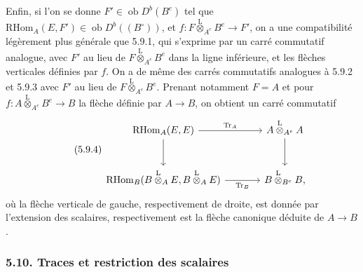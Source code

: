 \documentclass[11pt]{article}
\newcommand{\ob}{\operatorname{ob}}
\providecommand{\RHom}{\mathrm{RHom}}
\providecommand{\Tr}{\operatorname{Tr}}
\providecommand{\Tr}{\operatorname{Tr}}
\providecommand{\lten}{\overset{\mathrm L}{\otimes}}
\providecommand{\Tr}{\operatorname{Tr}}
\providecommand{\RHom}{\mathrm{RHom}}
\providecommand{\ob}{\operatorname{ob}}
\providecommand{\lten}{\overset{\mathrm L}{\otimes}}
\providecommand{\RHom}{\mathrm R\mathcal{H}om}
\providecommand{\lten}{\overset{\mathrm L}{\otimes}}
\providecommand{\Tr}{\operatorname{Tr}}
\providecommand{\lten}{\overset{\mathrm L}{\otimes}}
\providecommand{\lten}{\overset{\mathrm L}{\otimes}}
\providecommand{\lten}{\overset{\mathrm L}{\otimes}}
\providecommand{\RHom}{\mathrm{RHom}}
\providecommand{\Tr}{\operatorname{Tr}}
\providecommand{\lten}{\overset{\mathrm L}{\otimes}}
\begin{document}
Enfin, si l'on se donne $F'\in\ob D^b(B^e)$ tel que $\RHom_A(E,F')\in\ob D^b((B^\circ))$, et $f:F\lten_{A^e}B^e\to F'$, on a une compatibilité légèrement plus générale que 5.9.1, qui s'exprime par un carré commutatif analogue, avec $F'$ au lieu de $F\lten_{A^e}B^e$ dans la ligne inférieure, et les flèches verticales définies par $f$. On a de même des carrés commutatifs analogues à 5.9.2 et 5.9.3 avec $F'$ au lieu de $F\lten_{A^e}B^e$. Prenant notamment $F=A$ et pour $f:A\lten_{A^e}B^e\to B$ la flèche définie par $A\to B$, on obtient un carré commutatif
\begin{equation}\tag{5.9.4}
\begin{tikzcd}[column sep=large,row sep=large]
\RHom_A(E,E) \arrow[r,"\Tr_A"] \arrow[d] & A\lten_{A^e}A \arrow[d]\\
\RHom_B(B\lten_AE,B\lten_AE) \arrow[r,"\Tr_B"'] & B\lten_{B^e}B,
\end{tikzcd}
\end{equation}
où la flèche verticale de gauche, respectivement de droite, est donnée par l'extension des scalaires, respectivement est la flèche canonique déduite de $A\to B$.

\subsubsection*{5.10. Traces et restriction des scalaires}
\end{document}
